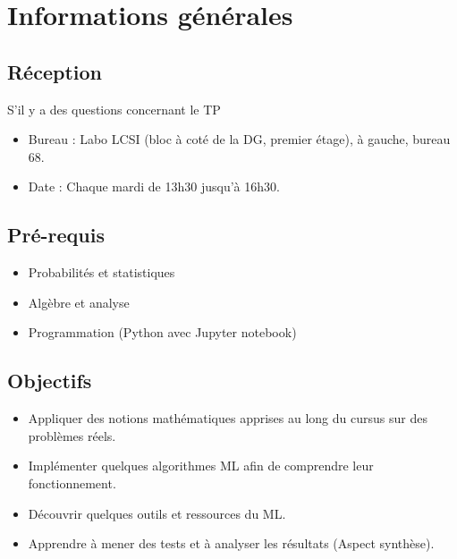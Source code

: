 \documentclass[11pt, a4paper]{article}
\begin{document}
\section{Informations générales}

\begin{minipage}{0.49\textwidth}
	
\subsection{Réception}

S'il y a des questions concernant le TP 
\begin{itemize}
	\item Bureau : Labo LCSI (bloc à coté de la DG, premier étage), à gauche, bureau 68.
	\item Date : Chaque mardi de 13h30 jusqu'à 16h30.
\end{itemize}

\subsection{Pré-requis}

\begin{itemize}
	\item Probabilités et statistiques
	\item Algèbre et analyse 
	\item Programmation (Python avec Jupyter notebook)
\end{itemize}
\end{minipage}
\begin{minipage}{0.49\textwidth}
\subsection{Objectifs}

\begin{itemize}
	\item Appliquer des notions mathématiques apprises au long du cursus sur des problèmes réels.
	\item Implémenter quelques algorithmes ML afin de comprendre leur fonctionnement.
	\item Découvrir quelques outils et ressources du ML.
	\item Apprendre à mener des tests et à analyser les résultats (Aspect synthèse).
\end{itemize}

\end{minipage}
\end{document}
